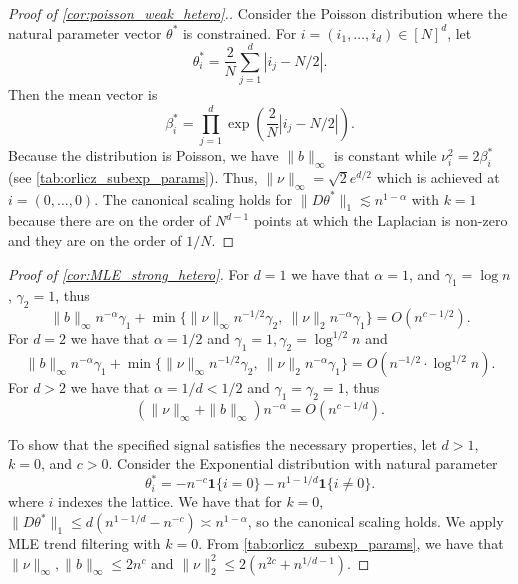 \documentclass[ejs,noshowframe]{imsart}
\theoremstyle{plain}
\theoremstyle{definition}
\newcommand{\one}{\mathbf{1}}
\begin{document}
\begin{appendix}
\begin{proof}[Proof of \autoref{cor:poisson_weak_hetero}.]
	Consider the Poisson distribution where the natural parameter vector 
	$\theta^*$ is constrained.
	For $i = (i_1, \ldots, i_d) \in [N]^d$, let
	\[
	\theta^*_i = \frac 2N \sum_{j=1}^d |i_j - N/2|. %
	\]
	Then the mean vector is
	\[
	\beta^*_i = \prod_{j=1}^d \exp\left(\frac 2N |i_j - N/2|\right). %
	\]
	Because the distribution is Poisson, we have $\| b \|_\infty$ is constant while
	$\nu_i^2 = 2 \beta_i^*$ (see \autoref{tab:orlicz_subexp_params}). 
	Thus, $\| \nu \|_\infty = \sqrt{2} e^{d/2}$ which is achieved at $i = 
	(0,\ldots,0)$.
	The canonical scaling holds for $\| D \theta^*\|_1 \lesssim n^{1-\alpha}$ with 
	$k=1$ because there are on the order of $N^{d-1}$ points at which the Laplacian 
	is non-zero and they are on the order of $1/N$. \qedhere
\end{proof}

\begin{proof}[Proof of \autoref{cor:MLE_strong_hetero}]
	For $d=1$ we have that $\alpha = 1$, and $\gamma_1 = \log n$, $\gamma_2 = 1$, 
	thus
	\[
	\| b \|_\infty  n^{-\alpha} \gamma_1 + \min\{ \| \nu \|_\infty n^{-1/2} 
	\gamma_2,\ \| \nu \|_2 n^{-\alpha} \gamma_1\} = O(n^{c-1/2}).
	\]
	For $d = 2$ we have that $\alpha = 1/2$ and $\gamma_1 = 1, \gamma_2 = 
	\log^{1/2} n$ and 
	\[
	\| b \|_\infty  n^{-\alpha} \gamma_1 + \min\{ \| \nu \|_\infty n^{-1/2} 
	\gamma_2,\ \| \nu \|_2 n^{-\alpha} \gamma_1\} = O(n^{-1/2} \cdot \log^{1/2} 
	n).
	\]
	For $d > 2$ we have that $\alpha = 1/d < 1/2$ and $\gamma_1 = \gamma_2 = 1$, 
	thus
	\[
	( \| \nu\|_\infty + \|b\|_\infty ) n^{-\alpha} = O(n^{c - 1/d}).
	\]


	To show that the specified signal satisfies the necessary properties, let
  $d>1$, $k=0$, and $c>0$. Consider the Exponential distribution with  
  natural parameter
  \begin{equation} 
    \label{eq:k0thetaex}
    \theta^*_i = -n^{-c} \one\{i=0\} - n^{1-1/d} \one\{i \neq 0\}.
  \end{equation}
  where $i$ indexes the lattice.
  We have that for $k=0$, $\|D \theta^* \|_1 \leq  d (n^{1-1/d} - n^{-c}) \asymp 
  n^{1-\alpha}$,
  so the canonical scaling holds. 
  We apply MLE trend filtering with $k=0$.
  From \autoref{tab:orlicz_subexp_params},
  we have 
  that $\| \nu \|_\infty, \| b \|_\infty \leq 2 n^c$  and $\| \nu \|_2^2 \leq 2 
  (n^{2c} + n^{1/d -1})$. \qedhere
\end{proof}


\end{appendix}
\end{document}

